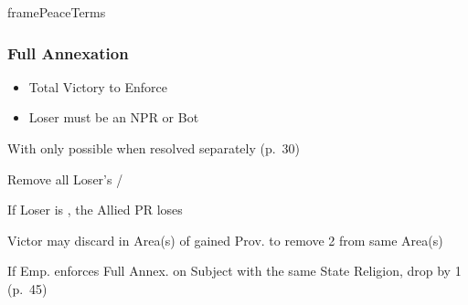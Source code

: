 \documentclass[10pt]{article}
\newlength{\fhPeaceTerms} \setlength\fhPeaceTerms{45.5\baselineskip}
\begin{document}
\begin{dynamiccontents*}{framePeaceTerms}
\begin{eubox}{\fhPeaceTerms}
\begin{multicols}{3}
		\subsubsection*{Full Annexation}
		\begin{itemize}
			{
				\color{peaceReqColor}
				\item {}
				\begin{itemize}
					\item Total Victory to Enforce
					\item Loser must be an NPR or Bot
				\end{itemize}
			}
			\item With  only possible when resolved separately (p.~30)
			\item Remove all Loser's \alliances/\marriages
			\item If Loser is \activeally, the Allied PR loses 
			\item Victor may discard \claims in Area(s) of gained Prov. to remove 2 \unrest from same Area(s)
			\item If Emp. enforces Full Annex. on Subject with the same State Religion, drop \authority by 1 (p.~45)
		\end{itemize}


\end{multicols}
\end{eubox}
\end{dynamiccontents*}
\end{document}
